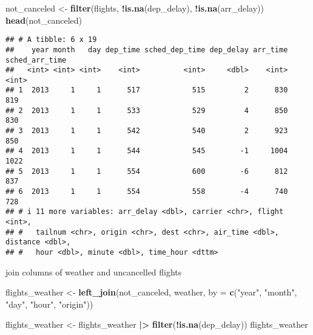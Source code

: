 \documentclass[
]{article}
\newenvironment{Shaded}{\begin{snugshade}}{\end{snugshade}}
\newcommand{\AttributeTok}[1]{\textcolor[rgb]{0.13,0.29,0.53}{#1}}
\newcommand{\FunctionTok}[1]{\textcolor[rgb]{0.13,0.29,0.53}{\textbf{#1}}}
\newcommand{\NormalTok}[1]{#1}
\newcommand{\OtherTok}[1]{\textcolor[rgb]{0.56,0.35,0.01}{#1}}
\newcommand{\SpecialCharTok}[1]{\textcolor[rgb]{0.81,0.36,0.00}{\textbf{#1}}}
\newcommand{\StringTok}[1]{\textcolor[rgb]{0.31,0.60,0.02}{#1}}
\begin{document}
\begin{Shaded}
\begin{Highlighting}[]
\NormalTok{not\_canceled }\OtherTok{\textless{}{-}} \FunctionTok{filter}\NormalTok{(flights, }\SpecialCharTok{!}\FunctionTok{is.na}\NormalTok{(dep\_delay), }\SpecialCharTok{!}\FunctionTok{is.na}\NormalTok{(arr\_delay))}
\FunctionTok{head}\NormalTok{(not\_canceled)}
\end{Highlighting}
\end{Shaded}

\begin{verbatim}
## # A tibble: 6 x 19
##    year month   day dep_time sched_dep_time dep_delay arr_time sched_arr_time
##   <int> <int> <int>    <int>          <int>     <dbl>    <int>          <int>
## 1  2013     1     1      517            515         2      830            819
## 2  2013     1     1      533            529         4      850            830
## 3  2013     1     1      542            540         2      923            850
## 4  2013     1     1      544            545        -1     1004           1022
## 5  2013     1     1      554            600        -6      812            837
## 6  2013     1     1      554            558        -4      740            728
## # i 11 more variables: arr_delay <dbl>, carrier <chr>, flight <int>,
## #   tailnum <chr>, origin <chr>, dest <chr>, air_time <dbl>, distance <dbl>,
## #   hour <dbl>, minute <dbl>, time_hour <dttm>
\end{verbatim}

join columns of weather and uncancelled flights

\begin{Shaded}
\begin{Highlighting}[]
\NormalTok{flights\_weather }\OtherTok{\textless{}{-}} \FunctionTok{left\_join}\NormalTok{(not\_canceled, weather, }\AttributeTok{by =} \FunctionTok{c}\NormalTok{(}\StringTok{"year"}\NormalTok{, }\StringTok{"month"}\NormalTok{, }\StringTok{"day"}\NormalTok{, }\StringTok{"hour"}\NormalTok{, }\StringTok{"origin"}\NormalTok{))}

\NormalTok{flights\_weather }\OtherTok{\textless{}{-}}\NormalTok{ flights\_weather }\SpecialCharTok{|\textgreater{}}
  \FunctionTok{filter}\NormalTok{(}\SpecialCharTok{!}\FunctionTok{is.na}\NormalTok{(dep\_delay))}
\NormalTok{flights\_weather}
\end{Highlighting}
\end{Shaded}
\end{document}
